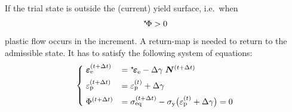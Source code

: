 \documentclass[times,namecite]{goose-article}
\newcommand\leftstar[1]{\hspace*{-.3em}~^\star\!#1}
\begin{document}
If the trial state is outside the (current) yield surface, i.e.\ when
\begin{equation}
  \leftstar{\Phi} > 0
\end{equation}
plastic flow occurs in the increment. A return-map is needed to return to the admissible state. It has to satisfy the following system of equations:
\begin{equation}
\begin{cases}
  \;
  \bm{\varepsilon}_\mathrm{e}^{(t+\Delta t)}
  &= \leftstar\bm{\varepsilon}_\mathrm{e}
   - \Delta \gamma \; \bm{N}^{(t+\Delta t)}
  \\[1ex]
  \;
  \varepsilon_\mathrm{p}^{(t+\Delta t)}
  &= \varepsilon_\mathrm{p}^{(t)} + \Delta \gamma
  \\[1ex]
  \;
  \Phi^{(t+\Delta t)}
  &= \sigma_\mathrm{eq}^{(t+\Delta t)}
   - \sigma_\mathrm{y} \big( \varepsilon_\mathrm{p}^{(t)} + \Delta\gamma \big)
   = 0
\end{cases}
\end{equation}
\end{document}
